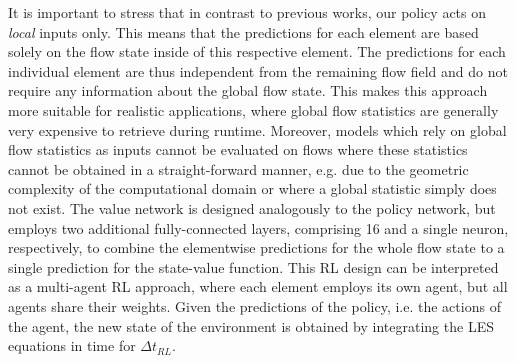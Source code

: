 It is important to stress that in contrast to previous works, our policy acts on \textit{local} inputs only.
This means that the predictions for each element are based solely on the flow state inside of this respective element.
The predictions for each individual element are thus independent from the remaining flow field and do not require any information about the global flow state.
This makes this approach more suitable for realistic applications, where global flow statistics are generally very expensive to retrieve during runtime.
Moreover, models which rely on global flow statistics as inputs cannot be evaluated on flows where these statistics cannot be obtained in a straight-forward manner, e.g. due to the geometric complexity of the computational domain or where a global statistic simply does not exist.
The value network is designed analogously to the policy network, but employs two additional fully-connected layers, comprising 16 and a single neuron, respectively, to combine the elementwise predictions for the whole flow state to a single prediction for the state-value function.
This RL design can be interpreted as a multi-agent RL approach, where each element employs its own agent, but all agents share their weights.
Given the predictions of the policy, i.e. the actions of the agent, the new state of the environment is obtained by integrating the LES equations in time for $\Delta t_{RL}$. 

